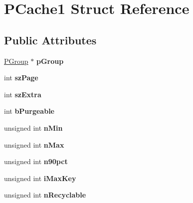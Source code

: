 \hypertarget{struct_p_cache1}{\section{P\-Cache1 Struct Reference}
\label{struct_p_cache1}
}
\subsection*{Public Attributes}
\begin{DoxyCompactItemize}
\item 
\hypertarget{struct_p_cache1_ae3389f0c68d6946a1eebeeee835ece69}{\hyperlink{struct_p_group}{P\-Group} $\ast$ {\bfseries p\-Group}}\label{struct_p_cache1_ae3389f0c68d6946a1eebeeee835ece69}

\item 
\hypertarget{struct_p_cache1_a1425039a858b7518c097d8ae92597de0}{int {\bfseries sz\-Page}}\label{struct_p_cache1_a1425039a858b7518c097d8ae92597de0}

\item 
\hypertarget{struct_p_cache1_a1e96e6671732e0af641732991b681ede}{int {\bfseries sz\-Extra}}\label{struct_p_cache1_a1e96e6671732e0af641732991b681ede}

\item 
\hypertarget{struct_p_cache1_a2af7d24e27369252addec9bef45afcfc}{int {\bfseries b\-Purgeable}}\label{struct_p_cache1_a2af7d24e27369252addec9bef45afcfc}

\item 
\hypertarget{struct_p_cache1_a9e96c79ec60c2e368f92a2ba52d01c44}{unsigned int {\bfseries n\-Min}}\label{struct_p_cache1_a9e96c79ec60c2e368f92a2ba52d01c44}

\item 
\hypertarget{struct_p_cache1_aef08139a0b86b0c0a7ee2bec0bab2405}{unsigned int {\bfseries n\-Max}}\label{struct_p_cache1_aef08139a0b86b0c0a7ee2bec0bab2405}

\item 
\hypertarget{struct_p_cache1_a8a5c5ab7d71e66c2a4df3f22513888f0}{unsigned int {\bfseries n90pct}}\label{struct_p_cache1_a8a5c5ab7d71e66c2a4df3f22513888f0}

\item 
\hypertarget{struct_p_cache1_a2dff616ad2d1873ad3a8d20d53bcb4d0}{unsigned int {\bfseries i\-Max\-Key}}\label{struct_p_cache1_a2dff616ad2d1873ad3a8d20d53bcb4d0}

\item 
\hypertarget{struct_p_cache1_a3501394bd251f08d1f9d26d3b2d4c67c}{unsigned int {\bfseries n\-Recyclable}}\label{struct_p_cache1_a3501394bd251f08d1f9d26d3b2d4c67c}


\end{DoxyCompactItemize}
